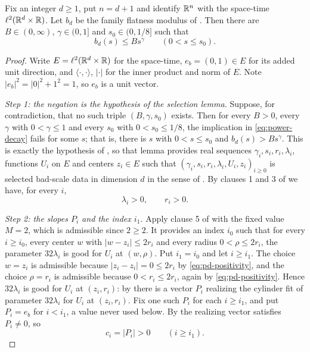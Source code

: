 \begin{theorem}
Fix an integer $d\ge1$, put $n=d+1$ and identify $\mathbb{R}^n$ with the space-time
$\ell^2(\mathbb{R}^d\times\mathbb{R})$. Let $b_d$ be the family flatness modulus of
. Then there are $B\in(0,\infty)$,
$\gamma\in(0,1]$ and $s_0\in(0,1/8]$ such that
\begin{equation}\label{eq:power-decay}
  b_d(s)\le Bs^\gamma\qquad(0<s\le s_0).
\end{equation}
\end{theorem}
\begin{proof}
Write $E=\ell^2(\mathbb{R}^d\times\mathbb{R})$ for the space-time, $e_b=(0,1)\in E$ for its
added unit direction, and $\langle\cdot,\cdot\rangle$, $|\cdot|$ for the inner
product and norm of $E$. Note $|e_b|^2=|0|^2+1^2=1$, so $e_b$ is a unit vector.

\emph{Step 1: the negation is the hypothesis of the selection lemma.}
Suppose, for contradiction, that no such triple $(B,\gamma,s_0)$ exists. Then
for every $B>0$, every $\gamma$ with $0<\gamma\le1$ and every $s_0$ with
$0<s_0\le1/8$, the implication in \eqref{eq:power-decay} fails for some $s$;
that is, there is $s$ with $0<s\le s_0$ and $b_d(s)>Bs^\gamma$. This is exactly
the hypothesis of , so that lemma provides real sequences
$\gamma_i,s_i,r_i,\lambda_i$, functions $U_i$ on $E$ and centers $z_i\in E$ such
that $(\gamma_i,s_i,r_i,\lambda_i,U_i,z_i)_{i\ge0}$ is selected bad-scale data
in dimension $d$ in the sense of . By clauses 1 and 3 of
 we have, for every $i$,
\begin{equation}\label{eq:pd-positivity}
  \lambda_i>0,\qquad r_i>0 .
\end{equation}

\emph{Step 2: the slopes $P_i$ and the index $i_1$.}
Apply clause 5 of  with the fixed value $M=2$, which is
admissible since $2\ge2$. It provides an index $i_0$ such that for every
$i\ge i_0$, every center $w$ with $|w-z_i|\le2r_i$ and every radius
$0<\rho\le2r_i$, the parameter $32\lambda_i$ is good for $U_i$ at $(w,\rho)$.
Put $i_1=i_0$ and let $i\ge i_1$. The choice $w=z_i$ is admissible because
$|z_i-z_i|=0\le2r_i$ by \eqref{eq:pd-positivity}, and the choice $\rho=r_i$ is
admissible because $0<r_i\le2r_i$, again by \eqref{eq:pd-positivity}. Hence
$32\lambda_i$ is good for $U_i$ at $(z_i,r_i)$: by  there
is a vector $P_i$ realizing the cylinder fit of parameter $32\lambda_i$ for
$U_i$ at $(z_i,r_i)$. Fix one such $P_i$ for each $i\ge i_1$, and put $P_i=e_b$
for $i<i_1$, a value never used below. By  the realizing
vector satisfies $P_i\ne0$, so
\begin{equation}\label{eq:pd-slope-positive}
  c_i=|P_i|>0\qquad(i\ge i_1).
\end{equation}


\end{proof}
